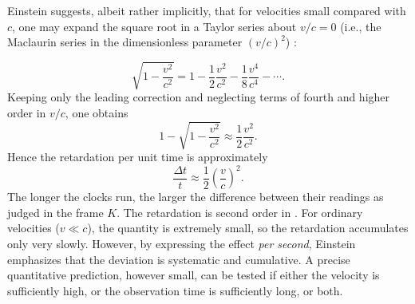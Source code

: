 \documentclass[pdflatex]{sn-jnl} %
\providecommand{\DIFaddbegin}{} %
\providecommand{\DIFaddend}{} %
\providecommand{\DIFdelbegin}{} %
\providecommand{\DIFdelend}{} %
\begin{document}
Einstein suggests, albeit rather implicitly, that for velocities small compared with $c$, one may expand the square root in a Taylor series about $v/c=0$ (i.e., the Maclaurin series in the dimensionless parameter $(v/c)^{2}$)%
%
\DIFdelbegin %
\DIFdelend \DIFaddbegin {}\DIFaddend %
%
:

\begin{equation*}
\sqrt{1-\frac{v^{2}}{c^{2}}}
=
1-\frac{1}{2}\frac{v^{2}}{c^{2}}
-\frac{1}{8}\frac{v^{4}}{c^{4}}
-\cdots .
\end{equation*}
%
Keeping only the leading correction and neglecting terms of fourth and higher order in $v/c$, one obtains
\begin{equation*}
1-\sqrt{1-\frac{v^{2}}{c^{2}}}
\approx
\frac{1}{2}\frac{v^{2}}{c^{2}} .
\end{equation*}
%
Hence the retardation per unit time is approximately
%
\begin{equation*}
\frac{\Delta t}{t}
\approx
\frac{1}{2}\left(\frac{v}{c}\right)^{2}.
\end{equation*}
%
The longer the clocks run, the larger the difference between their readings as judged in the frame $K$. The retardation is second order in \betafactorh. For ordinary velocities ($v\ll c$), the quantity \betafactorsquaredh is extremely small, so the retardation accumulates only very slowly. However, by expressing the effect \emph{per second}, Einstein emphasizes that the deviation is systematic and cumulative. A precise quantitative prediction, however small, can be tested if either the velocity is sufficiently high, or the observation time is sufficiently long, or both.
\end{document}
